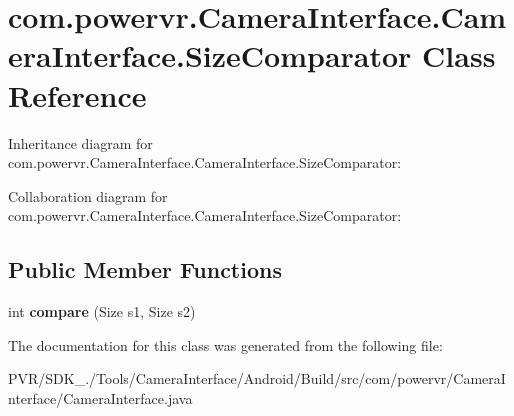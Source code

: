 \hypertarget{classcom_1_1powervr_1_1_camera_interface_1_1_camera_interface_1_1_size_comparator}{\section{com.\+powervr.\+Camera\+Interface.\+Camera\+Interface.\+Size\+Comparator Class Reference}
\label{classcom_1_1powervr_1_1_camera_interface_1_1_camera_interface_1_1_size_comparator}
}


Inheritance diagram for com.\+powervr.\+Camera\+Interface.\+Camera\+Interface.\+Size\+Comparator\+:


Collaboration diagram for com.\+powervr.\+Camera\+Interface.\+Camera\+Interface.\+Size\+Comparator\+:
\subsection*{Public Member Functions}
\begin{DoxyCompactItemize}
\item 
\hypertarget{classcom_1_1powervr_1_1_camera_interface_1_1_camera_interface_1_1_size_comparator_aab5b144e21e97d356314411afaf4935d}{int {\bfseries compare} (Size s1, Size s2)}\label{classcom_1_1powervr_1_1_camera_interface_1_1_camera_interface_1_1_size_comparator_aab5b144e21e97d356314411afaf4935d}

\end{DoxyCompactItemize}


The documentation for this class was generated from the following file\+:\begin{DoxyCompactItemize}
\item 
P\+V\+R/\+S\+D\+K\+\_./\+Tools/\+Camera\+Interface/\+Android/\+Build/src/com/powervr/\+Camera\+Interface/Camera\+Interface.\+java\end{DoxyCompactItemize}
